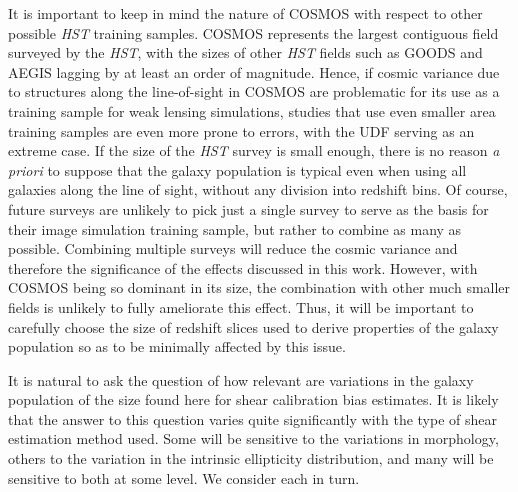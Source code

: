 \documentclass[twocolumn,useAMS,usenatbib]{mn2e}
\begin{document}
It is important to keep in mind the nature of COSMOS with respect to
other possible {\em HST} training samples.  COSMOS represents the
largest contiguous field surveyed by the {\em HST}, with the sizes of
other {\em HST} fields such as GOODS and AEGIS lagging by at least an
order of magnitude.  Hence, if cosmic variance due to structures along
the line-of-sight in COSMOS are problematic for its use as a training
sample for weak lensing simulations, studies that use even smaller
area training samples are even more prone to errors, with the UDF
serving as an extreme case.  If the size of the {\em HST} survey is
small enough, there is no reason {\em a priori} to suppose that the
galaxy population is typical even when using all galaxies along the
line of sight, without any division into redshift bins.  Of course,
future surveys are unlikely to pick just a single survey to serve as
the basis for their image simulation training sample, but rather
to combine as many as possible.  Combining multiple surveys will
reduce the cosmic variance and therefore the significance of the
effects discussed in this work.  However, with COSMOS being so
dominant in its size, the combination with other much smaller fields
is unlikely to fully ameliorate this effect.  Thus, it will be
important to carefully choose the size of redshift slices used to
derive properties of the galaxy population so as to be minimally
affected by this issue.

It is natural to ask the question of how relevant are variations in
the galaxy population of the size found here for shear calibration
bias estimates.  It is likely that the answer to this question varies
quite significantly with the type of shear estimation method used.
Some will be sensitive to the variations in morphology, others to the
variation in the intrinsic ellipticity distribution, and many will be
sensitive to both at some level.  We consider each in turn.
\end{document}
